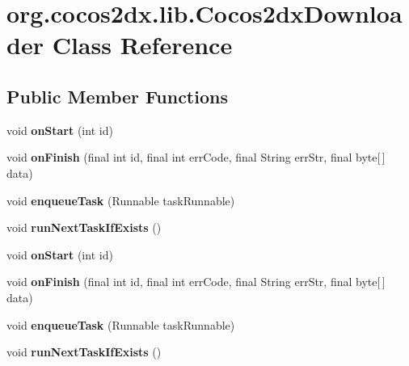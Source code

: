 \hypertarget{classorg_1_1cocos2dx_1_1lib_1_1Cocos2dxDownloader}{}\section{org.\+cocos2dx.\+lib.\+Cocos2dx\+Downloader Class Reference}
\label{classorg_1_1cocos2dx_1_1lib_1_1Cocos2dxDownloader}
\subsection*{Public Member Functions}
\begin{DoxyCompactItemize}
\item 
\mbox{\label{classorg_1_1cocos2dx_1_1lib_1_1Cocos2dxDownloader_a9380d8cb1ea644e03fe50b8ff1b86da3}} 
void {\bfseries on\+Start} (int id)
\item 
\mbox{\label{classorg_1_1cocos2dx_1_1lib_1_1Cocos2dxDownloader_a62f6e84a43f4be9e54e56d6336f26cb7}} 
void {\bfseries on\+Finish} (final int id, final int err\+Code, final String err\+Str, final byte\mbox{[}$\,$\mbox{]} data)
\item 
\mbox{\label{classorg_1_1cocos2dx_1_1lib_1_1Cocos2dxDownloader_ab2092d90a24f1d9b26fd382af7168048}} 
void {\bfseries enqueue\+Task} (Runnable task\+Runnable)
\item 
\mbox{\label{classorg_1_1cocos2dx_1_1lib_1_1Cocos2dxDownloader_a5e0e4662f9139734e6cfb3d438cf10f1}} 
void {\bfseries run\+Next\+Task\+If\+Exists} ()
\item 
\mbox{\label{classorg_1_1cocos2dx_1_1lib_1_1Cocos2dxDownloader_a9380d8cb1ea644e03fe50b8ff1b86da3}} 
void {\bfseries on\+Start} (int id)
\item 
\mbox{\label{classorg_1_1cocos2dx_1_1lib_1_1Cocos2dxDownloader_a62f6e84a43f4be9e54e56d6336f26cb7}} 
void {\bfseries on\+Finish} (final int id, final int err\+Code, final String err\+Str, final byte\mbox{[}$\,$\mbox{]} data)
\item 
\mbox{\label{classorg_1_1cocos2dx_1_1lib_1_1Cocos2dxDownloader_ab2092d90a24f1d9b26fd382af7168048}} 
void {\bfseries enqueue\+Task} (Runnable task\+Runnable)
\item 
\mbox{\label{classorg_1_1cocos2dx_1_1lib_1_1Cocos2dxDownloader_a5e0e4662f9139734e6cfb3d438cf10f1}} 
void {\bfseries run\+Next\+Task\+If\+Exists} ()
\end{DoxyCompactItemize}
